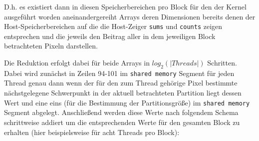 \documentclass[
    bibliography=totoc, cd=lightcolor, cdmath=false, ngerman]{tudscrreprt}
\DeclarePairedDelimiter\ceil{\lceil}{\rceil}
\begin{document}
\vspace{10pt}



\vspace{10pt}

D.h. es existiert dann in diesen Speicherbereichen pro Block für den der Kernel
ausgeführt worden aneinandergereiht Arrays deren Dimensionen bereits denen der
Host-Speicherbereichen auf die die Host-Zeiger \texttt{sums} und
\texttt{counts} zeigen entsprechen und die jeweils den Beitrag aller in dem
jeweiligen Block betrachteten Pixeln darstellen.

Die Reduktion erfolgt dabei für beide Arrays in
$log_2\left(\left|Threads\right|\right)$ Schritten. Dabei wird zunächst in
Zeilen 94-101 im \texttt{shared memory} Segment für jeden Thread genau dann
wenn der für den zum Thread gehörige Pixel bestimmte nächstgelegene Schwerpunkt
in der aktuell betrachteten Partition liegt dessen Wert und eine eins (für die
Bestimmung der Partitionsgröße) im \texttt{shared memory} Segment abgelegt.
Anschließend werden diese Werte nach folgendem Schema schrittweise addiert um
die entsprechenden Werte für den gesamten Block zu erhalten (hier
beispielsweise für acht Threads pro Block):
\end{document}
